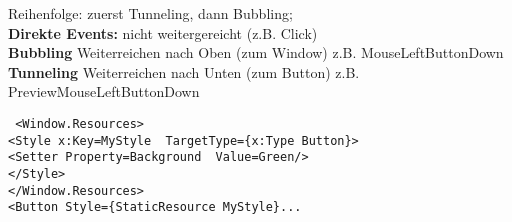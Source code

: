 Reihenfolge: zuerst Tunneling, dann Bubbling;\\
\textbf{Direkte Events:} nicht weitergereicht (z.B. Click)\\
\textbf{Bubbling} Weiterreichen nach Oben (zum Window) z.B. MouseLeftButtonDown \\
\textbf{Tunneling} Weiterreichen nach Unten (zum Button) z.B. PreviewMouseLeftButtonDown

\clearpage

\texttt{%
<Window.Resources>		\\
\tab <Style x:Key=\dq  MyStyle\dq ~  TargetType=\dq  \{x:Type Button\}\dq     >		\\
\tab \tab <Setter Property=\dq  Background\dq ~   Value=\dq  Green\dq    />				\\
\tab </Style>		\\
</Window.Resources>		\\
<Button Style=\dq  \{StaticResource MyStyle\}\dq   ...		
}

